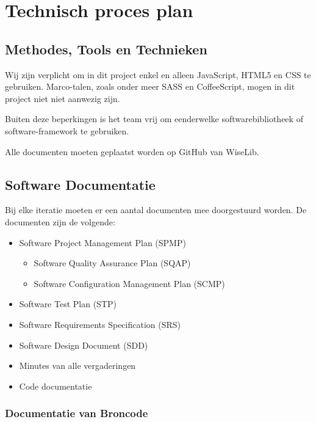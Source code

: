 \section{Technisch proces plan}

\subsection{Methodes, Tools en Technieken}

Wij zijn verplicht om in dit project enkel en alleen JavaScript, HTML5 en CSS te gebruiken. Marco-talen, zoals onder meer SASS en CoffeeScript, mogen in dit project niet niet aanwezig zijn.

Buiten deze beperkingen is het team vrij om eenderwelke softwarebibliotheek of software-framework te gebruiken.

Alle documenten moeten geplaatst worden op GitHub \cite{GitHub} van WiseLib.

\subsection{Software Documentatie}

Bij elke iteratie moeten er een aantal documenten mee doorgestuurd worden. \newline
De documenten zijn de volgende:

\begin{itemize}
\item Software Project Management Plan (SPMP)
\begin{itemize}
\item Software Quality Assurance Plan (SQAP)
\item Software Configuration Management Plan (SCMP)
\end{itemize}

\item Software Test Plan (STP)
\item Software Requirements Specification (SRS)
\item Software Design Document (SDD)
\item Minutes van alle vergaderingen 
\item Code documentatie 
\end{itemize}

\subsubsection{Documentatie van Broncode}

